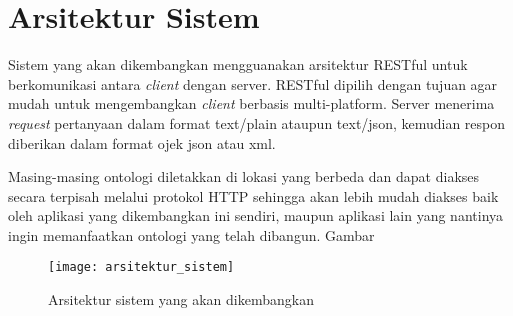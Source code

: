 \section{Arsitektur Sistem}
Sistem yang akan dikembangkan mengguanakan arsitektur RESTful untuk berkomunikasi antara \emph{client} dengan server. RESTful dipilih dengan tujuan agar mudah untuk mengembangkan \emph{client} berbasis multi-platform. Server menerima \emph{request} pertanyaan dalam format text/plain ataupun text/json, kemudian respon diberikan dalam format ojek json atau xml.

Masing-masing ontologi diletakkan di lokasi yang berbeda dan dapat diakses secara terpisah melalui protokol HTTP sehingga akan lebih mudah diakses baik oleh aplikasi yang dikembangkan ini sendiri, maupun aplikasi lain yang nantinya ingin memanfaatkan ontologi yang telah dibangun. Gambar 


\begin{figure}[h]
    \centering
    \texttt{[image: arsitektur\_sistem]}
    \caption{Arsitektur sistem yang akan dikembangkan}
    \label{fig:arsitektur_sistem}
\end{figure}